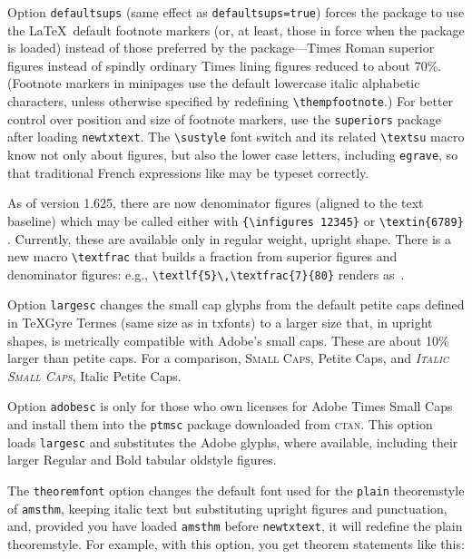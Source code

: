\documentclass[11pt]{article}
\theoremstyle{oldplain}
\theoremstyle{plain}
\begin{document}
Option {\tt defaultsups} (same effect as {\tt defaultsups=true}) forces the package to use the \LaTeX\ default footnote markers (or, at least, those in force when the package is loaded) instead of those preferred by the package---Times Roman superior figures instead of spindly ordinary Times lining figures reduced to about 70\%. (Footnote markers in minipages use the default lowercase italic alphabetic characters, unless otherwise specified by redefining \verb|\thempfootnote|.) For better control over position and size of footnote markers, use the {\tt superiors} package after loading {\tt newtxtext}. The \verb|\sustyle| font switch and its related \verb|\textsu| macro know not only about figures, but also the lower case letters, including \texttt{egrave}, so that traditional French expressions like  may be typeset correctly.

As of version 1.625, there are now denominator figures (aligned to the text baseline) which may be called either with \verb|{\infigures 12345}| {} or \verb|\textin{6789}| . Currently, these are available only in regular weight, upright shape. There is a new macro \verb|\textfrac| that builds a fraction from superior figures and denominator figures: e.g., \verb|\textlf{5}\,\textfrac{7}{80}| renders as \,.

Option \texttt{largesc} changes the small cap glyphs from the default petite caps defined in TeXGyre Termes (same size as in txfonts) to a larger size that, in upright shapes, is metrically compatible with Adobe's small caps. These are about 10\% larger than petite caps. For a comparison, \textsc{Small Caps}, {Petite Caps}, and \textsc{\textit{Italic Small Caps}}, {Italic Petite Caps}.

Option \texttt{adobesc} is only for those who own licenses for \textsf{Adobe Times Small Caps} and install them into the \texttt{ptmsc} package downloaded from \textsc{ctan}. This option loads \texttt{largesc} and substitutes the Adobe glyphs, where available, including their larger Regular and Bold tabular oldstyle figures.

The {\tt theoremfont} option changes the default font used for the {\tt plain} theoremstyle of {\tt amsthm}, keeping italic text but substituting upright figures and punctuation, and, provided you have loaded {\tt amsthm} before {\tt newtxtext}, it will redefine the plain theoremstyle.  For example, with this option, you get theorem statements like this:
\end{document}
